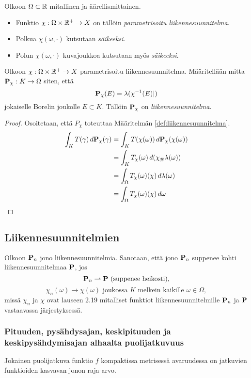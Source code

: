 \begin{definition}
    Olkoon $\Omega\subset \R$ mitallinen ja äärellismittainen. 
    \begin{itemize}
        \item Funktio $\chi:\Omega \times \R^+ \to X$ on tällöin \textit{parametrisoitu liikennesuunnitelma}. \item Polkua $\chi(\omega, \cdot)$ kutsutaan \textit{säikeeksi}.
        \item Polun $\chi(\omega, \cdot)$ kuvajoukkoa kutsutaan myös \textit{säikeeksi}.
    \end{itemize}
\end{definition}

\begin{theorem}
    Olkoon $\chi : \Omega \times \R^+ \to X$ parametrisoitu liikennesuunnitelma.
    Määritellään mitta $\P_\chi : K \to \Omega$ siten, että \[\P_\chi (E) = \lambda(\chi^{-1}(E)|)\] jokaiselle Borelin joukolle $E\subset K$. 
    Tällöin $\P_\chi$ on \textit{liikennesuunnitelma}. 
\end{theorem}

\begin{proof}
Osoitetaan, että $P_\chi$ toteuttaa Määritelmän \ref{def:liikennesuunnitelma}.
\begin{align*}
    \int_K T(\gamma)\, d\P_\chi(\gamma) &= \int_K T(\chi(\omega))\, d\P_\chi(\chi(\omega)) \\
    &= \int_K T_\chi(\omega) \, d(\chi_\# \lambda(\omega)) \\
    &= \int_\Omega T_\chi(\omega)(\chi) \, d\lambda(\omega) \\
    &= \int_\Omega T_\chi(\omega)(\chi) \, d\omega \\
\end{align*}

\end{proof}

\subsection{Liikennesuunnitelmien }
\begin{definition}
    Olkoon $\P_n$ jono liikennesuunnitelmia. Sanotaan, että jono $\P_n$ suppenee kohti liikennesuunnitelmaa $\P$, jos 
    $$\P_n \rightharpoonup \P \text{ (suppenee heikosti)},$$
    $$ \chi_n (\omega) \to  \chi (\omega) \text{ joukossa } K \text{ melkein kaikille } \omega
    \in \Omega,$$
    missä $ \chi_n$ ja $ \chi$ ovat lauseen 2.19 mitalliset funktiot liikennesuunnitelmille $\P_n$ ja $\P$ vastaavassa järjestyksessä.
\end{definition}

\subsubsection{Pituuden, pysähdysajan, keskipituuden ja keskipysähdymisajan alhaalta puolijatkuvuus}

\begin{lemma}
    Jokainen puolijatkuva funktio $f$ kompaktissa metrisessä avaruudessa on jatkuvien funktioiden kasvavan jonon raja-arvo.
\end{lemma}
